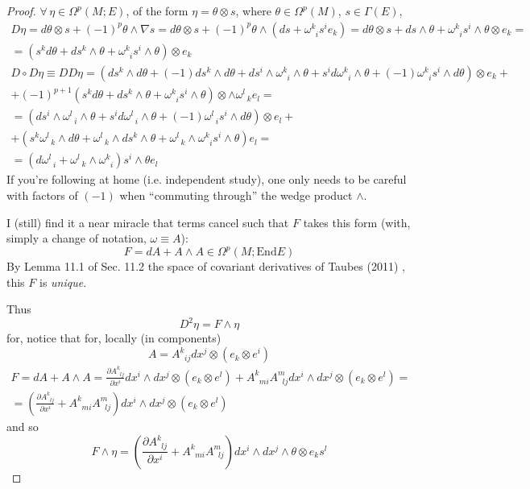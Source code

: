 \documentclass[10pt]{amsart}
\begin{document}
\begin{proof}
$\forall \, \eta \in \Omega^p(M;E)$, of the form $\eta = \theta \otimes s$, where $\theta \in \Omega^p(M)$, $s\in \Gamma(E)$, 
\[
\begin{gathered}
  D\eta = d\theta \otimes s + (-1)^p \theta \wedge \nabla s = d\theta \otimes s + (-1)^p \theta \wedge (ds + \omega^k_{ \; \; i } s^i e_k) = d\theta \otimes s + ds \wedge \theta + \omega^k_{ \; \; i} s^i \wedge \theta \otimes e_k = \\
  = (s^k d\theta + ds^k \wedge \theta + \omega^k_{ \; \; i } s^i \wedge \theta ) \otimes e_k 
\end{gathered}
\]
\[
\begin{gathered}
  D\circ D \eta \equiv DD\eta = (ds^k \wedge d\theta + (-1)ds^k \wedge d\theta + ds^i \wedge \omega^k_{ \; \; i} \wedge \theta + s^i d\omega^k_{ \; \; i } \wedge \theta + (-1) \omega^k_{ \; \; i} s^i \wedge d\theta ) \otimes e_k +\\
  + (-1)^{p+1}(s^k d\theta + ds^k \wedge \theta + \omega^k_{ \; \; i} s^i \wedge \theta ) \otimes \wedge \omega^l_{ \; \; k} e_l = \\
  = (ds^i \wedge \omega^l_{ \; \; i} \wedge \theta + s^i d\omega^l_{ \; \; i} \wedge \theta + (-1) \omega^l_{ \; \; i} s^i \wedge d\theta ) \otimes e_l + \\
  + (s^k \omega^l_{ \; \; k} \wedge d\theta + \omega^l_{ \; \; k } \wedge ds^k \wedge \theta + \omega^l_{ \; \; k} \wedge \omega^k_{ \; \; i } s^i \wedge \theta ) e_l = \\
  = (d\omega^l_{ \; \; i} + \omega^l_{ \; \; k } \wedge \omega^k_{ \; \; i} )s^i \wedge \theta e_l
\end{gathered}
\]
If you're following at home (i.e. independent study), one only needs to be careful with factors of $(-1)$ when ``commuting through'' the wedge product $\wedge$.  

I (still) find it a near miracle that terms cancel such that $F$ takes this form (with, simply a change of notation, $\omega \equiv A$):
\[
F = dA + A\wedge A \in \Omega^p(M;\text{End}E)
\]
By Lemma 11.1 of Sec. 11.2 the space of covariant derivatives of Taubes (2011) \cite{CTaubes2011}, this $F$ is \emph{unique}.  

Thus
\[
D^2 \eta = F \wedge \eta 
\]
for, notice that for, locally (in components)
\[
A = A^k_{ \; \; ij} dx^j \otimes (e_k \otimes e^i)
\]
\[
\begin{gathered}
  F = dA + A \wedge A = \frac{ \partial A^k_{ \; \; lj} }{  \partial x^i } dx^i \wedge dx^j \otimes (e_k \otimes e^l) + A^k_{  \; \; mi } A^m_{ \; \; lj } dx^i \wedge dx^j \otimes (e_k \otimes e^l) = \\
  = \left( \frac{ \partial A^k_{ \; \; lj} }{ \partial x^i} + A^k_{ \; \; mi} A^m_{ \; \; lj } \right) dx^i \wedge dx^j \otimes (e_k \otimes e^l )
\end{gathered}
\]
and so
\[
F\wedge \eta = \left( \frac{ \partial A^k_{ \; \; lj} }{ \partial x^i } + A^k_{ \; \; mi} A^m_{ \; \; lj } \right) dx^i \wedge dx^j \wedge \theta \otimes e_k s^l
\]
\end{proof}
\end{document}
